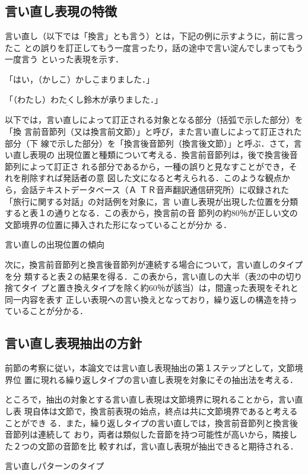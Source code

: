 \subsection{言い直し表現の特徴}
言い直し（以下では「換言」とも言う）とは，下記の例に示すように，前に言ったこ
との誤りを訂正してもう一度言ったり，話の途中で言い淀んでしまってもう一度言う
といった表現を示す．

\Vspace
                  「はい，（かしこ）\(\underline{かしこまり}\)ました．」

                  「（わたし）\(\underline{わたくし}\)鈴木が承りました．」

\Vspace
以下では，言い直しによって訂正される対象となる部分（括弧で示した部分）を「換
言前音節列（又は換言前文節）」と呼び，また言い直しによって訂正された部分（下
線で示した部分）を「換言後音節列（換言後文節）」と呼ぶ．さて，言い直し表現の
出現位置と種類について考える．換言前音節列は，後で換言後音節列によって訂正さ
れる部分であるから，一種の誤りと見なすことができ，それを削除すれば発話者の意
図した文になると考えられる．このような観点から，会話テキストデータベース（Ａ
ＴＲ音声翻訳通信研究所）に収録された「旅行に関する対話」の対話例を対象に，言
い直し表現が出現した位置を分類すると表１の通りとなる．この表から，換言前の音
節列の約80％が正しい文の文節境界の位置に挿入された形になっていることが分か
る．
\begin{table}[htbp]
  \begin{center}
    \caption{言い直しの出現位置の傾向}
    \label{tab:1}
    \medskip
{}
  \end{center}
\end{table}

次に，換言前音節列と換言後音節列が連続する場合について，言い直しのタイプを分
類すると表２の結果を得る．この表から，言い直しの大半（表2の中の切り捨てタイ
プと置き換えタイプを除く約60％が該当）は，間違った表現をそれと同一内容を表す
正しい表現への言い換えとなっており，繰り返しの構造を持っていることが分かる．
\subsection{言い直し表現抽出の方針}
前節の考察に従い，本論文では言い直し表現抽出の第１ステップとして，文節境界位
置に現れる繰り返しタイプの言い直し表現を対象にその抽出法を考える．

ところで，抽出の対象とする言い直し表現は文節境界に現れることから，言い直し表
現自体は文節で，換言前表現の始点，終点は共に文節境界であると考えることができ
る．また，繰り返しタイプの言い直しでは，換言前音節列と換言後音節列は連続して
おり，両者は類似した音節を持つ可能性が高いから，隣接した２つの文節の音節を比
較すれば，言い直し表現が抽出できると期待される．
\begin{table}[htbp]
  \begin{center}
    \caption{言い直しパターンのタイプ}
    \label{tab:2}
    \medskip
{}
    \vspace*{-3mm}
  \end{center}
\end{table}

